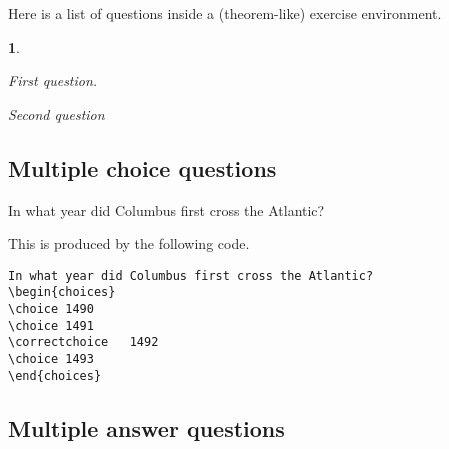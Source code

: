 \documentclass{article}
\newtheorem{exercise}{\exercisename}
\begin{document}
\bigskip
Here is a list of questions inside a (theorem-like) exercise environment.
\begin{exercise}

\begin{questions}
\item[] %
\question First question.
\question Second question 
\end{questions}
\end{exercise}
%
\subsection{Multiple choice questions}

In what year did Columbus first cross the Atlantic?
\begin{choices}
\end{choices}

This is produced by the following code.
\begin{Verbatim}[frame=single]
In what year did Columbus first cross the Atlantic?
\begin{choices}
\choice 1490 
\choice 1491 
\correctchoice   1492 
\choice 1493 
\end{choices}
\end{Verbatim}

\subsection{Multiple answer questions}
\end{document}
